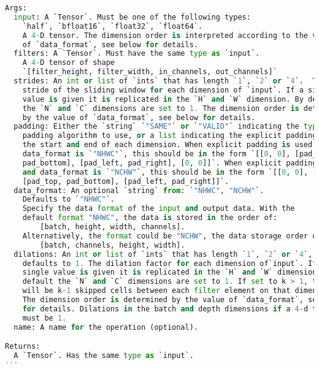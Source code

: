 \begin{lstlisting}[language=python, title=tf.nn.conv2d~~参数说明]
Args:
  input: A `Tensor`. Must be one of the following types:
    `half`, `bfloat16`, `float32`, `float64`.
    A 4-D tensor. The dimension order is interpreted according to the value
    of `data_format`, see below for details.
  filters: A `Tensor`. Must have the same type as `input`.
    A 4-D tensor of shape
    `[filter_height, filter_width, in_channels, out_channels]`
  strides: An int or list of `ints` that has length `1`, `2` or `4`.  The
    stride of the sliding window for each dimension of `input`. If a single
    value is given it is replicated in the `H` and `W` dimension. By default
    the `N` and `C` dimensions are set to 1. The dimension order is determined
    by the value of `data_format`, see below for details.
  padding: Either the `string` `"SAME"` or `"VALID"` indicating the type of
    padding algorithm to use, or a list indicating the explicit paddings at
    the start and end of each dimension. When explicit padding is used and
    data_format is `"NHWC"`, this should be in the form `[[0, 0], [pad_top,
    pad_bottom], [pad_left, pad_right], [0, 0]]`. When explicit padding used
    and data_format is `"NCHW"`, this should be in the form `[[0, 0], [0, 0],
    [pad_top, pad_bottom], [pad_left, pad_right]]`.
  data_format: An optional `string` from: `"NHWC", "NCHW"`.
    Defaults to `"NHWC"`.
    Specify the data format of the input and output data. With the
    default format "NHWC", the data is stored in the order of:
        [batch, height, width, channels].
    Alternatively, the format could be "NCHW", the data storage order of:
        [batch, channels, height, width].
  dilations: An int or list of `ints` that has length `1`, `2` or `4`,
    defaults to 1. The dilation factor for each dimension of`input`. If a
    single value is given it is replicated in the `H` and `W` dimension. By
    default the `N` and `C` dimensions are set to 1. If set to k > 1, there
    will be k-1 skipped cells between each filter element on that dimension.
    The dimension order is determined by the value of `data_format`, see above
    for details. Dilations in the batch and depth dimensions if a 4-d tensor
    must be 1.
  name: A name for the operation (optional).

Returns:
  A `Tensor`. Has the same type as `input`.
'''
  \end{lstlisting}


